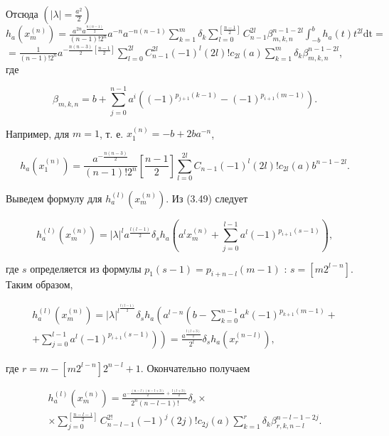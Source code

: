 \documentclass[10pt]{article}
\begin{document}
Отсюда $\left(|\lambda|=\frac{a^{2}}{2}\right)$\\
$h_{a}\left(x_{m}^{(n)}\right)=\frac{a^{2 n} a^{\frac{n(n-1)}{2}}}{(n-1)!2^{n}} a^{-n} a^{-n(n-1)} \sum_{k=1}^{m} \delta_{k} \sum_{l=0}^{\left[\frac{n-1}{2}\right]} C_{n-1}^{2 l} \beta_{m, k, n}^{n-1-2 l} \int_{-b}^{b} h_{a}(t) t^{2 l} \mathrm{dt}=$\\
$=\frac{1}{(n-1)!2^{n}} a^{-\frac{n(n-3)}{2}\left[\frac{n-1}{2}\right]} \sum_{l=0}^{2 l} C_{n-1}^{2 l}(-1)^{l}(2 l)!c_{2 l}(a) \sum_{k=1}^{m} \delta_{k} \beta_{m, k, n}^{n-1-2 l}$,\\
где

$$
\beta_{m, k, n}=b+\sum_{j=0}^{n-1} a^{i}\left((-1)^{p_{j+1}(k-1)}-(-1)^{p_{i+1}(m-1)}\right) .
$$

Например, для $m=1$, т. е. $x_{1}^{(n)}=-b+2 b a^{-n}$,


\begin{equation*}
h_{a}\left(x_{1}^{(n)}\right)=\frac{a^{-\frac{n(n-3)}{2}}}{(n-1)!2^{n}}\left[\frac{n-1}{2}\right] \sum_{l=0}^{2 l} C_{n-1}(-1)^{l}(2 l)!c_{2 l}(a) b^{n-1-2 l} . \tag{3.55}
\end{equation*}


Выведем формулу для $h_{a}^{(l)}\left(x_{m}^{(n)}\right)$. Из (3.49) следует


\begin{equation*}
h_{a}^{(l)}\left(x_{m}^{(n)}\right)=|\lambda|^{l} a^{\frac{l(l-1)}{2}} \delta_{s} h_{a}\left(a^{l} x_{m}^{(n)}+\sum_{j=0}^{l-1} a^{l}(-1)^{p_{i+1}(s-1)}\right), \tag{3.56}
\end{equation*}


где $s$ определяется из формулы $p_{1}(s-1)=p_{i+n-l}(m-1)$ : $s=\left[m 2^{l-n}\right]$. Таким образом,


\begin{gather*}
h_{a}^{(l)}\left(x_{m}^{(n)}\right)=|\lambda|^{l^{\frac{l(l-1)}{2}}} \delta_{s} h_{a}\left(a ^ { l - n } \left(b-\sum_{k=0}^{n-1} a^{k}(-1)^{p_{k+1}(m-1)}+\right.\right. \\
\left.\left.+\sum_{j=0}^{l-1} a^{l}(-1)^{p_{i+1}(s-1)}\right)\right)=\frac{a^{\frac{l(l+3)}{2}}}{2^{l}} \delta_{s} h_{a}\left(x_{r}^{(n-l)}\right), \tag{3.57}
\end{gather*}


где $r=m-\left[m 2^{l-n}\right] 2^{n-l}+1$. Окончательно получаем


\begin{gather*}
h_{a}^{(l)}\left(x_{m}^{(n)}\right)=\frac{a^{-\frac{(n-l)(n-l+3)}{2}+\frac{l(l+3)}{2}}}{2^{n}(n-l-1)!} \delta_{s} \times \\
\times \sum_{j=0}^{\left[\frac{n-l-1}{2}\right]} C_{n-l-1}^{2!}(-1)^{j}(2 j)!c_{2 j}(a) \sum_{k=1}^{r} \delta_{k} \beta_{r, k, n-l}^{n-l-1-2 j} . \tag{3.58}
\end{gather*}
\end{document}
